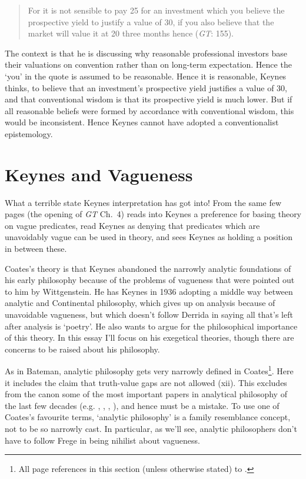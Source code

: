 \begin{quote}
For it is not sensible to pay 25 for an investment which you believe the prospective yield to justify a value of 30, if you also believe that the market will value it at 20 three months hence (\textit{GT}: 155).
\end{quote}

\noindent The context is that he is discussing why reasonable professional investors base their valuations on convention rather than on long-term expectation. Hence the `you' in the quote is assumed to be reasonable. Hence it is reasonable, Keynes thinks, to believe that an investment's prospective yield justifies a value of 30, and that conventional wisdom is that its prospective yield is much lower. But if all reasonable beliefs were formed by accordance with conventional wisdom, this would be inconsistent. Hence Keynes cannot have adopted a conventionalist epistemology.
 
\section{Keynes and Vagueness}

What a terrible state Keynes interpretation has got into! From the same few pages (the opening of \textit{GT} Ch.~4) \citet{Coates1996} reads into Keynes a preference for basing theory on vague predicates, \citet{BradfordHarcourt1997} read Keynes as denying that predicates which are unavoidably vague can be used in theory, and \citet{ODonnell1997} sees Keynes as holding a position in between these.

Coates's theory is that Keynes abandoned the narrowly analytic foundations of his early philosophy because of the problems of vagueness that were pointed out to him by Wittgenstein. He has Keynes in 1936 adopting a middle way between analytic and Continental philosophy, which gives up on analysis because of unavoidable vagueness, but which doesn't follow Derrida in saying all that's left after analysis is `poetry'. He also wants to argue for the philosophical importance of this theory. In this essay I'll focus on his exegetical theories, though there are concerns to be raised about his philosophy.

As in Bateman, analytic philosophy gets very narrowly defined in Coates\footnote{All page references in this section (unless otherwise stated) to \citet{Coates1996}.}. Here it includes the claim that truth-value gaps are not allowed (xii). This excludes from the canon some of the most important papers in analytical philosophy of the last few decades (e.g. \citet{Dummett1959}, \citet{vanFraassen1966}, \citet{Fine1975a}, \citet{Kripke1975}), and hence must be a mistake. To use one of Coates's favourite terms, `analytic philosophy' is a family resemblance concept, not to be so narrowly cast. In particular, as we'll see, analytic philosophers don't have to follow Frege in being nihilist about vagueness.

